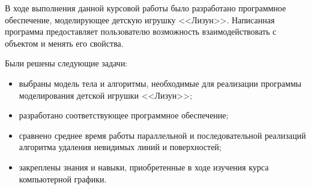 
В ходе выполнения данной курсовой работы было разработано программное обеспечение, моделирующее детскую игрушку <<Лизун>>. Написанная программа предоставляет пользователю возможность взаимодействовать с объектом и менять его свойства.

Были решены следующие задачи:
\begin{itemize}
	\item выбраны модель тела и алгоритмы, необходимые для реализации программы моделирования детской игрушки <<Лизун>>;
	\item разработано соответствующее программное обеспечение;
	\item сравнено среднее время работы параллельной и последовательной реализаций алгоритма удаления невидимых линий и поверхностей;
	\item закреплены знания и навыки, приобретенные в ходе изучения курса компьютерной графики.
\end{itemize}
